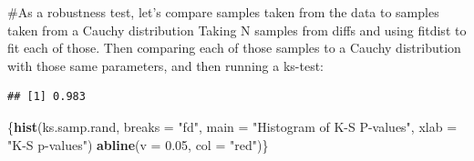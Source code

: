 \documentclass[]{article}
\newenvironment{Shaded}{\begin{snugshade}}{\end{snugshade}}
\newcommand{\CommentTok}[1]{\textcolor[rgb]{0.56,0.35,0.01}{\textit{#1}}}
\newcommand{\ControlFlowTok}[1]{\textcolor[rgb]{0.13,0.29,0.53}{\textbf{#1}}}
\newcommand{\DataTypeTok}[1]{\textcolor[rgb]{0.13,0.29,0.53}{#1}}
\newcommand{\DecValTok}[1]{\textcolor[rgb]{0.00,0.00,0.81}{#1}}
\newcommand{\FloatTok}[1]{\textcolor[rgb]{0.00,0.00,0.81}{#1}}
\newcommand{\KeywordTok}[1]{\textcolor[rgb]{0.13,0.29,0.53}{\textbf{#1}}}
\newcommand{\NormalTok}[1]{#1}
\newcommand{\OperatorTok}[1]{\textcolor[rgb]{0.81,0.36,0.00}{\textbf{#1}}}
\newcommand{\OtherTok}[1]{\textcolor[rgb]{0.56,0.35,0.01}{#1}}
\newcommand{\StringTok}[1]{\textcolor[rgb]{0.31,0.60,0.02}{#1}}
\begin{document}
\#As a robustness test, let's compare samples taken from the data to
samples taken from a Cauchy distribution Taking N samples from diffs and
using fitdist to fit each of those. Then comparing each of those samples
to a Cauchy distribution with those same parameters, and then running a
ks-test:

\begin{Shaded}
\end{Shaded}

\begin{verbatim}
## [1] 0.983
\end{verbatim}

\begin{Shaded}
\begin{Highlighting}[]
\NormalTok{\{}\KeywordTok{hist}\NormalTok{(ks.samp.rand, }\DataTypeTok{breaks =} \StringTok{"fd"}\NormalTok{, }\DataTypeTok{main =} \StringTok{"Histogram of K-S P-values"}\NormalTok{, }\DataTypeTok{xlab =} \StringTok{"K-S p-values"}\NormalTok{)}
\KeywordTok{abline}\NormalTok{(}\DataTypeTok{v =} \FloatTok{0.05}\NormalTok{, }\DataTypeTok{col =} \StringTok{"red"}\NormalTok{)\}}
\end{Highlighting}
\end{Shaded}
\end{document}
